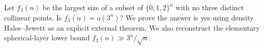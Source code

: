 Let $f_3(n)$ be the largest size of a subset of $\{0,1,2\}^n$ with
no three distinct collinear points. Is $f_3(n)=o(3^n)$?
We prove the answer is yes using density Hales--Jewett as an explicit
external theorem. We also reconstruct the elementary spherical-layer
lower bound $f_3(n)\gg3^n/\sqrt n$.
